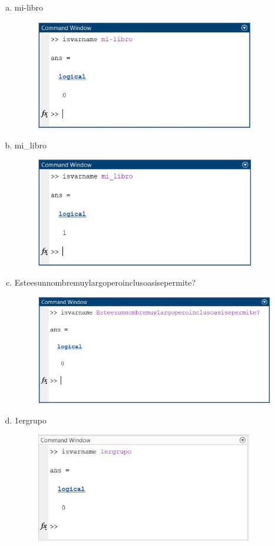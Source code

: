 \documentclass{article}
\begin{document}
\begin{enumerate}[a)]
\begin{figure}[H]
        \end{figure}
    \item mi-libro
        \begin{figure}[H]
        \centering
        \includegraphics[height=4.8cm]{img6d.jpg}
        \end{figure}
    \item mi\_libro
        \begin{figure}[H]
        \centering
        \includegraphics[height=4.8cm]{img6e.jpg}
        \end{figure}
    \item Esteesunnombremuylargoperoinclusoasisepermite?
        \begin{figure}[H]
        \centering
        \includegraphics[height=4.8cm]{img6f.jpg}
        \end{figure}
    \item 1ergrupo
        \begin{figure}[H]
        \centering
        \includegraphics[height=4.8cm]{img6g.jpg}

\end{figure}
\end{enumerate}
\end{document}
